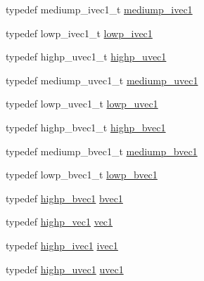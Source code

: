 \begin{CompactItemize}
\item 
typedef mediump\_\-ivec1\_\-t \hyperlink{namespaceglm_7efcceaaa791c2380d1b17bd7baa45ee}{mediump\_\-ivec1}
\item 
typedef lowp\_\-ivec1\_\-t \hyperlink{namespaceglm_5d781b915bec50a9d5b5383835035533}{lowp\_\-ivec1}
\item 
typedef highp\_\-uvec1\_\-t \hyperlink{namespaceglm_2a480125ab05aa522d883651ea1101f8}{highp\_\-uvec1}
\item 
typedef mediump\_\-uvec1\_\-t \hyperlink{namespaceglm_1fa5a5fb993ee72b4dc8d2a9caf85b26}{mediump\_\-uvec1}
\item 
typedef lowp\_\-uvec1\_\-t \hyperlink{namespaceglm_d50d8a6d477675ffc627f0949f1d5615}{lowp\_\-uvec1}
\item 
typedef highp\_\-bvec1\_\-t \hyperlink{namespaceglm_d24a2ac97dbfbece48f504224bb20b59}{highp\_\-bvec1}
\item 
typedef mediump\_\-bvec1\_\-t \hyperlink{namespaceglm_6c2cab6a7010331621a5ce656dd5f58d}{mediump\_\-bvec1}
\item 
typedef lowp\_\-bvec1\_\-t \hyperlink{namespaceglm_f22d6a46a35bcda63801fe78c033f35f}{lowp\_\-bvec1}
\item 
typedef \hyperlink{namespaceglm_d24a2ac97dbfbece48f504224bb20b59}{highp\_\-bvec1} \hyperlink{namespaceglm_30260c045e085bb8d19eddca772cac61}{bvec1}
\item 
typedef \hyperlink{group__gtc__type__precision_gb3f08c031846e7a95b49e81c48d920d3}{highp\_\-vec1} \hyperlink{namespaceglm_16030dae9029ed1eab1553a2183bbb79}{vec1}
\item 
typedef \hyperlink{namespaceglm_ddb6724b01f125e2730aeaad6130b06f}{highp\_\-ivec1} \hyperlink{namespaceglm_946031cea0c22745848ebd873e6facb0}{ivec1}
\item 
typedef \hyperlink{namespaceglm_2a480125ab05aa522d883651ea1101f8}{highp\_\-uvec1} \hyperlink{namespaceglm_4e12bc23a3d060164eef452f81d92a03}{uvec1}
\end{CompactItemize}
